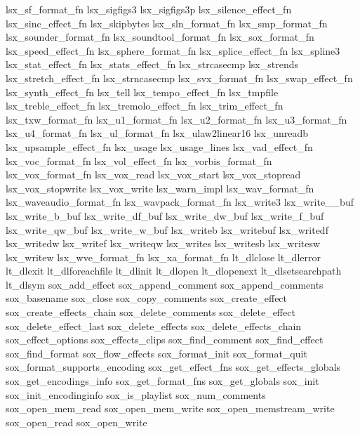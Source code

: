lsx\+\_\+sf\+\_\+format\+\_\+fn lsx\+\_\+sigfigs3 lsx\+\_\+sigfigs3p lsx\+\_\+silence\+\_\+effect\+\_\+fn lsx\+\_\+sinc\+\_\+effect\+\_\+fn lsx\+\_\+skipbytes lsx\+\_\+sln\+\_\+format\+\_\+fn lsx\+\_\+smp\+\_\+format\+\_\+fn lsx\+\_\+sounder\+\_\+format\+\_\+fn lsx\+\_\+soundtool\+\_\+format\+\_\+fn lsx\+\_\+sox\+\_\+format\+\_\+fn lsx\+\_\+speed\+\_\+effect\+\_\+fn lsx\+\_\+sphere\+\_\+format\+\_\+fn lsx\+\_\+splice\+\_\+effect\+\_\+fn lsx\+\_\+spline3 lsx\+\_\+stat\+\_\+effect\+\_\+fn lsx\+\_\+stats\+\_\+effect\+\_\+fn lsx\+\_\+strcasecmp lsx\+\_\+strends lsx\+\_\+stretch\+\_\+effect\+\_\+fn lsx\+\_\+strncasecmp lsx\+\_\+svx\+\_\+format\+\_\+fn lsx\+\_\+swap\+\_\+effect\+\_\+fn lsx\+\_\+synth\+\_\+effect\+\_\+fn lsx\+\_\+tell lsx\+\_\+tempo\+\_\+effect\+\_\+fn lsx\+\_\+tmpfile lsx\+\_\+treble\+\_\+effect\+\_\+fn lsx\+\_\+tremolo\+\_\+effect\+\_\+fn lsx\+\_\+trim\+\_\+effect\+\_\+fn lsx\+\_\+txw\+\_\+format\+\_\+fn lsx\+\_\+u1\+\_\+format\+\_\+fn lsx\+\_\+u2\+\_\+format\+\_\+fn lsx\+\_\+u3\+\_\+format\+\_\+fn lsx\+\_\+u4\+\_\+format\+\_\+fn lsx\+\_\+ul\+\_\+format\+\_\+fn lsx\+\_\+ulaw2linear16 lsx\+\_\+unreadb lsx\+\_\+upsample\+\_\+effect\+\_\+fn lsx\+\_\+usage lsx\+\_\+usage\+\_\+lines lsx\+\_\+vad\+\_\+effect\+\_\+fn lsx\+\_\+voc\+\_\+format\+\_\+fn lsx\+\_\+vol\+\_\+effect\+\_\+fn lsx\+\_\+vorbis\+\_\+format\+\_\+fn lsx\+\_\+vox\+\_\+format\+\_\+fn lsx\+\_\+vox\+\_\+read lsx\+\_\+vox\+\_\+start lsx\+\_\+vox\+\_\+stopread lsx\+\_\+vox\+\_\+stopwrite lsx\+\_\+vox\+\_\+write lsx\+\_\+warn\+\_\+impl lsx\+\_\+wav\+\_\+format\+\_\+fn lsx\+\_\+waveaudio\+\_\+format\+\_\+fn lsx\+\_\+wavpack\+\_\+format\+\_\+fn lsx\+\_\+write3 lsx\+\_\+write\+\_\+\_\+buf lsx\+\_\+write\+\_\+b\+\_\+buf lsx\+\_\+write\+\_\+df\+\_\+buf lsx\+\_\+write\+\_\+dw\+\_\+buf lsx\+\_\+write\+\_\+f\+\_\+buf lsx\+\_\+write\+\_\+qw\+\_\+buf lsx\+\_\+write\+\_\+w\+\_\+buf lsx\+\_\+writeb lsx\+\_\+writebuf lsx\+\_\+writedf lsx\+\_\+writedw lsx\+\_\+writef lsx\+\_\+writeqw lsx\+\_\+writes lsx\+\_\+writesb lsx\+\_\+writesw lsx\+\_\+writew lsx\+\_\+wve\+\_\+format\+\_\+fn lsx\+\_\+xa\+\_\+format\+\_\+fn lt\+\_\+dlclose lt\+\_\+dlerror lt\+\_\+dlexit lt\+\_\+dlforeachfile lt\+\_\+dlinit lt\+\_\+dlopen lt\+\_\+dlopenext lt\+\_\+dlsetsearchpath lt\+\_\+dlsym sox\+\_\+add\+\_\+effect sox\+\_\+append\+\_\+comment sox\+\_\+append\+\_\+comments sox\+\_\+basename sox\+\_\+close sox\+\_\+copy\+\_\+comments sox\+\_\+create\+\_\+effect sox\+\_\+create\+\_\+effects\+\_\+chain sox\+\_\+delete\+\_\+comments sox\+\_\+delete\+\_\+effect sox\+\_\+delete\+\_\+effect\+\_\+last sox\+\_\+delete\+\_\+effects sox\+\_\+delete\+\_\+effects\+\_\+chain sox\+\_\+effect\+\_\+options sox\+\_\+effects\+\_\+clips sox\+\_\+find\+\_\+comment sox\+\_\+find\+\_\+effect sox\+\_\+find\+\_\+format sox\+\_\+flow\+\_\+effects sox\+\_\+format\+\_\+init sox\+\_\+format\+\_\+quit sox\+\_\+format\+\_\+supports\+\_\+encoding sox\+\_\+get\+\_\+effect\+\_\+fns sox\+\_\+get\+\_\+effects\+\_\+globals sox\+\_\+get\+\_\+encodings\+\_\+info sox\+\_\+get\+\_\+format\+\_\+fns sox\+\_\+get\+\_\+globals sox\+\_\+init sox\+\_\+init\+\_\+encodinginfo sox\+\_\+is\+\_\+playlist sox\+\_\+num\+\_\+comments sox\+\_\+open\+\_\+mem\+\_\+read sox\+\_\+open\+\_\+mem\+\_\+write sox\+\_\+open\+\_\+memstream\+\_\+write sox\+\_\+open\+\_\+read sox\+\_\+open\+\_\+write 